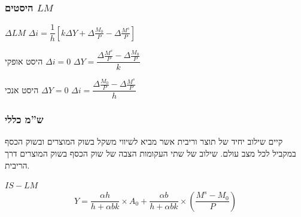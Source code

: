 \documentclass[usenames,dvipsnames]{beamer}
\newcommand{\D}[1]{\Delta #1}
\begin{document}
\begin{RTL}
\begin{frame}
        \end{frame}

        \begin{frame}
            \frametitle{היסטים $LM$}
            \begin{alertblock}{$\D{LM}$}
                $\Delta i = \dfrac{1}{h} \left[k\D{Y} + \D{\frac{M_0}{P}} - \D{\frac{M^s}{P}}\right]$  
            \end{alertblock}
            
            \begin{block}{ היסט אופקי $\Delta i = 0 $}
                $\D{Y} = \dfrac{\D{\frac{M^s}{P}} - \D{\frac{M_0}{P}}}{k}$
            \end{block}

            \begin{block}{ היסט אנכי $\Delta Y = 0 $}
                $\D{i} = \dfrac{\D{\frac{M_0}{P}} - \D{\frac{M^s}{P}} }{h}$
            \end{block}

            
        
        \end{frame}
        \begin{frame}
            \frametitle{ש''מ כללי}
            קיים שילוב יחיד של תוצר וריבית אשר מביא לשיווי משקל בשוק המוצרים ובשוק הכסף במקביל לכל מצב
עולם.
שילוב של שתי העקומות הצבה של שוק הכסף בשוק המוצרים דרך הריבית.
\begin{block}{$IS-LM$}
    \begin{equation*}
        Y=\frac{\alpha h}{h+\alpha b k} \times A_0+\frac{\alpha b}{h+\alpha b k} \times\left(\frac{M^s-M_0}{P}\right)
    \end{equation*}
\end{block}
        
            
        
        \end{frame}


\end{RTL}
\end{document}
